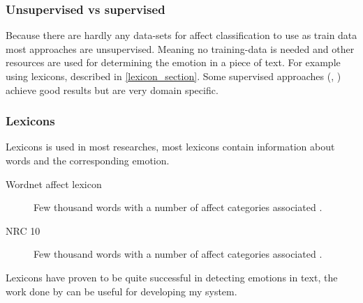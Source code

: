 \documentclass[11pt]{article}
\begin{document}
\subsubsection{Unsupervised vs supervised}
Because there are hardly any data-sets for affect classification to use as train data most approaches are unsupervised. Meaning no training-data is needed and other resources are used for determining the emotion in a piece of text. For example using lexicons, described in \ref{lexicon_section}. Some supervised approaches (\cite{chaffar2011using}, \cite{kim2010evaluation}) achieve good results but are very domain specific.


\subsubsection{Lexicons}
\label{lexion_section}
Lexicons is used in most researches, most lexicons contain information about words and the corresponding emotion.
\begin{description}
\item[Wordnet affect lexicon] Few thousand words with a number of affect categories associated \cite{strapparava2004wordnet}.
\item [NRC 10] Few thousand words with a number of affect categories associated \cite{mohammad:2012:NAACL-HLT}.
\end{description}
Lexicons have proven to be quite successful in detecting emotions in text, the work done by  can be useful for developing my system.




\end{document}
